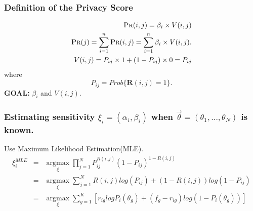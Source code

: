 \documentclass{beamer}
\begin{document}
\begin{frame}[fragile]
  \frametitle{Definition of the Privacy Score}
\begin{align}
  \textsc{Pr}(i,j)=\beta_i\times V(i,j) \\
  \textsc{Pr}(j)=\sum_{i=1}^{n}\textsc{Pr}(i,j)=\sum_{i=1}^n\beta_i\times
  V(i,j). \\
  V(i,j)=P_{ij}\times 1 + (1-P_{ij})\times 0 = P_{ij}
\end{align}
  where \[P_{ij} = Prob\{\textbf{R}(i,j)=1\}.\]
  \Large{\textbf{GOAL:} $\beta_i$ and $V(i,j)$}.
\end{frame}

\begin{frame}
  \frametitle{\large{Estimating sensitivity $\xi_i=(\alpha_i,\beta_i)$ when
      $\overrightarrow{\theta}=(\theta_1,\dots,\theta_N)$ is known.}}
      \Large{Use Maximum Likelihood Estimation(MLE).}
      \large{
        \begin{eqnarray}
          \xi_i^{MLE}&=&\underset{\xi}{\operatorname{\arg\max}}
          {\prod_{j=1}^NP_{ij}^{R(i,j)}(1-P_{ij})^{1-R(i,j)}}
          \nonumber \\
          &=& \underset{\xi}{\operatorname{\arg\max}}
          {\sum_{j=1}^NR(i,j) log(P_{ij})+(1-R(i,j))log(1-P_{ij})}
          \nonumber \\
          &=&\underset{\xi}{\operatorname{\arg\max}}
          {\sum_{g=1}^K[r_{ig}logP_i(\theta_g)+(f_g-r_{ig})log(1-P_i(\theta_g))]}
        \end{eqnarray}
        }
\end{frame}
\end{document}
